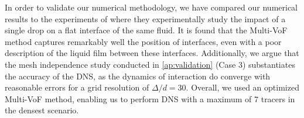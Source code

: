 In order to validate our numerical methodology, we have compared our numerical results to the experiments of \citet{mohamed2003drop} where they experimentally study the impact of a single drop on a flat interface of the same fluid. %
It is found that the Multi-VoF method captures remarkably well the position of interfaces, even with a poor description of the liquid film between these interfaces.
Additionally, we argue that the mesh independence study conducted in \ref{ap:validation} (Case 3) substantiates the accuracy of the DNS, as the dynamics of interaction do converge with  reasonable errors for a grid resolution of $\Delta/d = 30$. 
Overall, we used an optimized Multi-VoF method, enabling us to perform DNS with a maximum of 7 tracers in the densest scenario.
 





